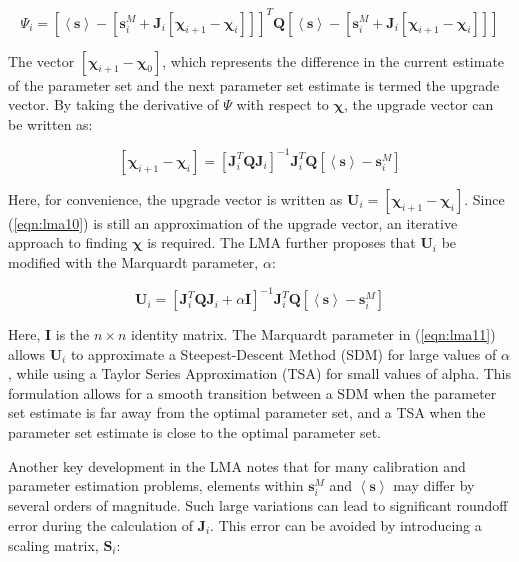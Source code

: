 \begin{equation}
\Psi_{i}=\left[\left<\mathbf{s}\right>-\left[\mathbf{s}^M_i + \mathbf{J}_i \left[ \boldsymbol{\chi}_{i+1}-\boldsymbol{\chi}_i \right] \right]\right]^T \mathbf{Q} \left[\left<\mathbf{s}\right>-\left[\mathbf{s}^M_i + \mathbf{J}_i \left[ \boldsymbol{\chi}_{i+1}-\boldsymbol{\chi}_i \right]\right]\right]
\label{eqn:lma9a}
\end{equation}

The vector $\left[ \boldsymbol{\chi}_{i+1}-\boldsymbol{\chi}_0 \right]$, which represents the difference in the current estimate of the parameter set and the next parameter set estimate is termed the upgrade vector. By taking the derivative of $\Psi$ with respect to $\boldsymbol{\chi}$, the upgrade vector can be written as:

\begin{equation}
\left[ \boldsymbol{\chi}_{i+1}-\boldsymbol{\chi}_i \right] = \left[\mathbf{J}_i^T\mathbf{Q}\mathbf{J}_i\right]^{-1}\mathbf{J}_i^T\mathbf{Q}\left[\left<\mathbf{s}\right>-\mathbf{s}^M_i\right]
\label{eqn:lma10}
\end{equation}

Here, for convenience, the upgrade vector is written as $\mathbf{U}_{i} = \left[ \boldsymbol{\chi}_{i+1}-\boldsymbol{\chi}_i \right]$. Since (\ref{eqn:lma10}) is still an approximation of the upgrade vector, an iterative approach to finding $\boldsymbol{\chi}$ is required. The LMA further proposes that $\boldsymbol{U}_i$ be modified with the Marquardt parameter, $\alpha$:

\begin{equation}
\mathbf{U}_{i} = \left[\mathbf{J}_i^T\mathbf{Q}\mathbf{J}_i+\alpha\mathbf{I}\right]^{-1}\mathbf{J}_i^T\mathbf{Q}\left[\left<\mathbf{s}\right>-\mathbf{s}^M_i\right]
\label{eqn:lma11}
\end{equation}

Here, $\mathbf{I}$ is the $n\times n$ identity matrix. The Marquardt parameter in (\ref{eqn:lma11}) allows $\mathbf{U}_{i}$ to approximate a Steepest-Descent Method (SDM) for large values of $\alpha$, while using a Taylor Series Approximation (TSA) for small values of alpha. This formulation allows for a smooth transition between a SDM when the parameter set estimate is far away from the optimal parameter set, and a TSA when the parameter set estimate is close to the optimal parameter set.

Another key development in the LMA notes that for many calibration and parameter estimation problems, elements within $\mathbf{s}^M_i$ and $\left<\mathbf{s}\right>$ may differ by several orders of magnitude. Such large variations can lead to significant roundoff error during the calculation of $\mathbf{J}_i$. This error can be avoided by introducing a scaling matrix, $\mathbf{S}_i$:

